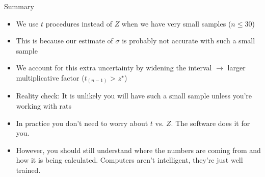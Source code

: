 \documentclass[10pt,handout]{beamer}\usepackage[]{graphicx}\usepackage[]{color}
\begin{document}
\begin{frame}{Summary}
	\begin{itemize}
		\setlength\itemsep{1em}
		\item We use $t$ procedures instead of $Z$ when we have very small samples ($n \leq 30$)
		\item This is because our estimate of $\sigma$ is probably not accurate with such a small sample
		\item We account for this extra uncertainty by widening the interval $\to$ larger multiplicative factor ($t_{(n-1)}$ > $z^\star$) \pause 
		\item Reality check: It is unlikely you will have such a small sample unless you're working with rats
		\item In practice you don't need to worry about $t$ vs. $Z$. The software does it for you.
		\item However, you should still understand where the numbers are coming from and how it is being calculated. Computers aren't intelligent, they're just well trained. 
	\end{itemize}
\end{frame}
\end{document}
